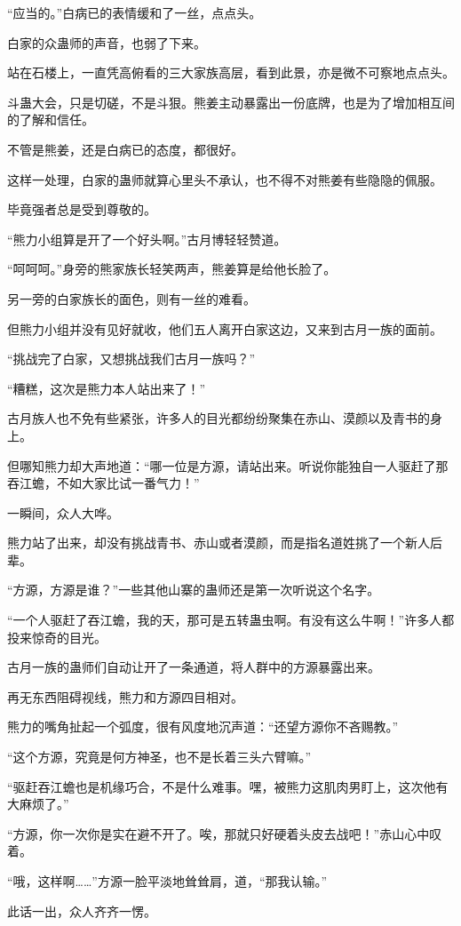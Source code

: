 \begin{this_body}
“应当的。”白病已的表情缓和了一丝，点点头。

白家的众蛊师的声音，也弱了下来。

站在石楼上，一直凭高俯看的三大家族高层，看到此景，亦是微不可察地点点头。

斗蛊大会，只是切磋，不是斗狠。熊姜主动暴露出一份底牌，也是为了增加相互间的了解和信任。

不管是熊姜，还是白病已的态度，都很好。

这样一处理，白家的蛊师就算心里头不承认，也不得不对熊姜有些隐隐的佩服。

毕竟强者总是受到尊敬的。

“熊力小组算是开了一个好头啊。”古月博轻轻赞道。

“呵呵呵。”身旁的熊家族长轻笑两声，熊姜算是给他长脸了。

另一旁的白家族长的面色，则有一丝的难看。

但熊力小组并没有见好就收，他们五人离开白家这边，又来到古月一族的面前。

“挑战完了白家，又想挑战我们古月一族吗？”

“糟糕，这次是熊力本人站出来了！”

古月族人也不免有些紧张，许多人的目光都纷纷聚集在赤山、漠颜以及青书的身上。

但哪知熊力却大声地道：“哪一位是方源，请站出来。听说你能独自一人驱赶了那吞江蟾，不如大家比试一番气力！”

一瞬间，众人大哗。

熊力站了出来，却没有挑战青书、赤山或者漠颜，而是指名道姓挑了一个新人后辈。

“方源，方源是谁？”一些其他山寨的蛊师还是第一次听说这个名字。

“一个人驱赶了吞江蟾，我的天，那可是五转蛊虫啊。有没有这么牛啊！”许多人都投来惊奇的目光。

古月一族的蛊师们自动让开了一条通道，将人群中的方源暴露出来。

再无东西阻碍视线，熊力和方源四目相对。

熊力的嘴角扯起一个弧度，很有风度地沉声道：“还望方源你不吝赐教。”

“这个方源，究竟是何方神圣，也不是长着三头六臂嘛。”

“驱赶吞江蟾也是机缘巧合，不是什么难事。嘿，被熊力这肌肉男盯上，这次他有大麻烦了。”

“方源，你一次你是实在避不开了。唉，那就只好硬着头皮去战吧！”赤山心中叹着。

“哦，这样啊……”方源一脸平淡地耸耸肩，道，“那我认输。”

此话一出，众人齐齐一愣。

\end{this_body}

